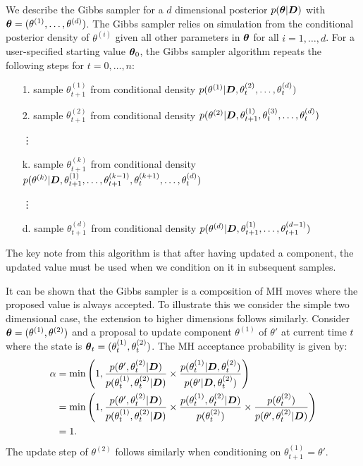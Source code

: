 We describe the Gibbs sampler for a \(d\) dimensional posterior \(p(\boldsymbol{\theta} | \boldsymbol{D})\) with \(\boldsymbol{\theta} =
(\theta^{(1)}, \ldots, \theta^{(d)})\). The Gibbs sampler relies on simulation from the conditional posterior density of
\(\theta^{(i)}\) given all other parameters in \(\boldsymbol{\theta}\) for all \(i = 1, \ldots, d\). For a
user-specified starting value \(\boldsymbol{\theta}_0\), the Gibbs sampler algorithm repeats the following steps for \(t = 0,
\ldots, n\):
\begin{itemize}
  \item[1.] sample \(\theta^{(1)}_{t+1}\) from conditional density \(p(\theta^{(1)} | \boldsymbol{D}, \theta^{(2)}_t, \ldots,
  \theta^{(d)}_t)\)
  \item[2.] sample \(\theta^{(2)}_{t+1}\) from conditional density \(p(\theta^{(2)} | \boldsymbol{D}, \theta^{(1)}_{t+1},
  \theta^{(3)}_t, \ldots, \theta^{(d)}_t)\)
  \item[] \hspace{1cm} \vdots
  \item[k.] sample \(\theta^{(k)}_{t+1}\) from conditional density \(p(\theta^{(k)} | \boldsymbol{D}, \theta^{(1)}_{t+1},
  \ldots, \theta^{(k-1)}_{t+1}, \theta^{(k+1)}_t, \ldots, \theta^{(d)}_t)\)
  \item[] \hspace{1cm} \vdots
  \item[d.] sample \(\theta^{(d)}_{t+1}\) from conditional density \(p(\theta^{(d)} | \boldsymbol{D}, \theta^{(1)}_{t+1},
  \ldots, \theta^{(d-1)}_{t+1})\)
\end{itemize}
The key note from this algorithm is that after having updated a component, the updated value must be used when we
condition on it in subsequent samples. 

It can be shown that the Gibbs sampler is a composition of \gls{MH} moves where the proposed value is always accepted.
To illustrate this we consider the simple two dimensional case, the extension to higher dimensions follows similarly.
Consider \(\boldsymbol{\theta} = (\theta^{(1)}, \theta^{(2)})\) and a proposal to update component \(\theta^{(1)}\) of
\(\theta'\) at current time \(t\) where the state is \(\boldsymbol{\theta}_t = (\theta^{(1)}_t, \theta^{(2)}_t)\). The \gls{MH}
acceptance probability is given by:
\begin{align} 
\alpha &= \min\left(1, 
\frac{p(\theta', \theta^{(2)}_t | \boldsymbol{D})}
{p(\theta^{(1)}_t, \theta^{(2)}_t | \boldsymbol{D})} \times 
\frac{p(\theta^{(1)}_t | \boldsymbol{D}, \theta^{(2)}_t)}
{p(\theta' | \boldsymbol{D}, \theta^{(2)}_t)} \right) \notag\\
&= \min\left(1, 
\frac{p(\theta', \theta^{(2)}_t | \boldsymbol{D})}
{p(\theta^{(1)}_t, \theta^{(2)}_t | \boldsymbol{D})} \times 
\frac{p(\theta^{(1)}_t, \theta^{(2)}_t | \boldsymbol{D})}
{p(\theta^{(2)}_t)} \times
\frac{p(\theta^{(2)}_t)}
{p(\theta', \theta^{(2)}_t | \boldsymbol{D})}
\right) \notag\\
&= 1.
\end{align}
The update step of \(\theta^{(2)}\) follows similarly when conditioning on \(\theta^{(1)}_{t+1} = \theta'\). 

